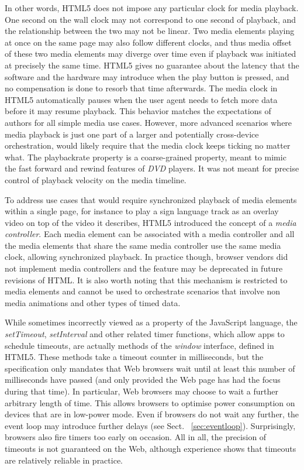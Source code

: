 In other words, HTML5 does not impose any particular clock for media playback.
One second on the wall clock may not correspond to one second of playback, and
the relationship between the two may not be linear. Two media elements playing
at once on the same page may also follow different clocks, and thus media
offset of these two media elements may diverge over time even if playback was
initiated at precisely the same time. HTML5 gives no guarantee about the
latency that the software and the hardware may introduce when the play button
is pressed, and no compensation is done to resorb that time afterwards. The
media clock in HTML5 automatically pauses when the user agent needs to fetch
more data before it may resume playback. This behavior matches the
expectations of authors for all simple media use cases. However, more advanced
scenarios where media playback is just one part of a larger and potentially
cross-device orchestration, would likely require that the media clock keeps
ticking no matter what. The playbackrate property is a coarse-grained
property, meant to mimic the fast forward and rewind features of \emph{DVD}
players. It was not meant for precise control of playback velocity on the
media timeline.

To address use cases that would require synchronized playback of media
elements within a single page, for instance to play a sign language track as
an overlay video on top of the video it describes, HTML5 introduced the
concept of a \emph{media controller}. Each media element can be associated with a media
controller and all the media elements that share the same media controller use
the same media clock, allowing synchronized playback. In practice though, browser vendors did not implement media
controllers and the feature may be deprecated in future revisions of HTML. It
is also worth noting that this mechanism is restricted to media elements and
cannot be used to orchestrate scenarios that involve non media animations and
other types of timed data.

While sometimes incorrectly viewed as a property of the JavaScript language,
the \emph{setTimeout}, \emph{setInterval} and other related timer functions, which allow
apps to schedule timeouts, are actually methods of the \emph{window} interface,
defined in HTML5. These methods take a timeout counter in milliseconds, but
the specification only mandates that Web browsers wait until at least this
number of milliseconds have passed (and only provided the Web page has had the
focus during that time). In particular, Web browsers may choose to wait a
further arbitrary length of time. This allows browsers to optimise power
consumption on devices that are in low-power mode. Even if browsers do not
wait any further, the event loop may introduce further delays (see Sect. ~\ref{sec:eventloop}). Surprisingly, browsers also fire timers too early on occasion. All in all, the precision of timeouts is not guaranteed on
the Web, although experience shows that timeouts are relatively reliable in
practice.


